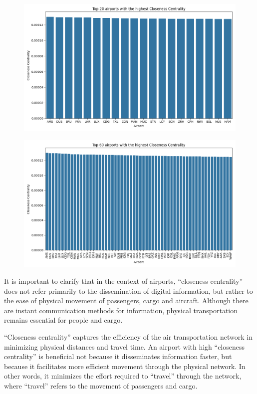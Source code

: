 \documentclass[12pt]{article}
\begin{document}
    \begin{figure}[H]
        \centering
        \includegraphics[width=0.8\linewidth]{img/closeness_centrality}
    \end{figure}
    \begin{figure}[H]
        \centering
        \includegraphics[width=0.8\linewidth]{img/more_closeness_centrality}
    \end{figure}

    It is important to clarify that in the context of airports, “closeness centrality” does not refer primarily to the dissemination of digital information, but rather to the ease of physical movement of passengers, cargo and aircraft. Although there are instant communication methods for information, physical transportation remains essential for people and cargo.

    “Closeness centrality” captures the efficiency of the air transportation network in minimizing physical distances and travel time. An airport with high “closeness centrality” is beneficial not because it disseminates information faster, but because it facilitates more efficient movement through the physical network. In other words, it minimizes the effort required to “travel” through the network, where “travel” refers to the movement of passengers and cargo.
    
\end{document}
